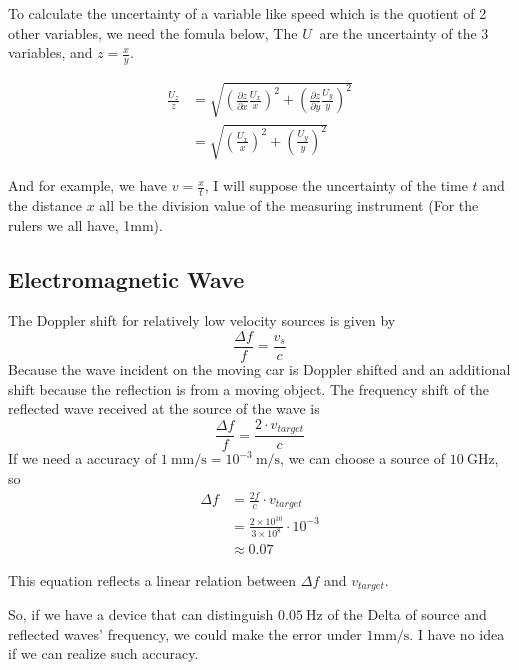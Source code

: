 \documentclass{article}
\begin{document}
To calculate the uncertainty of a variable like speed which is the quotient of
2 other variables, we need the fomula below, The $U~$ are the uncertainty of
the 3 variables, and $z = \frac{x}{y}$.


\begin{align}
    \frac{U_z}{z} & = \sqrt{ (\frac{\partial z}{\partial x} \frac{U_x}
     {x})^2 +  (\frac{\partial z}{\partial y} \frac{U_y}{y})^2} \label
     {fomula} \\
                  & = \sqrt{ ( \frac{U_x}{x})^2 +  (\frac{U_y}{y})^2}
\end{align}

And for example, we have $v = \frac{x}{t}$, I will suppose the uncertainty of
the time $t$ and the distance $x$ all be the division value of the measuring
instrument (For the rulers we all have, 1mm).



\subsection{Electromagnetic Wave} The Doppler shift for relatively low
 velocity sources is given by
\begin{equation}
    \frac{\Delta f}{f} = \frac{v_s}{c}
\end{equation} Because the wave incident on the moving car is Doppler shifted
 and an additional shift because the reflection is from a moving object. The
 frequency shift of the reflected wave received at the source of the wave is
\begin{equation}
    \frac{\Delta f}{f} = \frac{2 \cdot v_{target}}{c}
\end{equation} If we need a accuracy of $1~\mathrm{mm/s} = 10^{-3}~\mathrm
 {m/s}$, we can choose a source of $10~\mathrm{GHz}$, so
\begin{equation}
    \begin{aligned}
        \Delta f & = \frac{2f}{c} \cdot v_{target}                        \\
                 & = \frac{2 \times 10^{10}}{3\times10^{8}} \cdot 10^{-3} \\
                 & \approx 0.07
    \end{aligned}
\end{equation}

This equation reflects a linear relation between $\Delta f$ and $v_{target}$.

So, if we have a device that can distinguish $0.05~\mathrm{Hz}$ of the Delta
of source and reflected waves' frequency, we could make the error under
$1\mathrm{mm/s}$. I have no idea if we can realize such accuracy.
\end{document}
